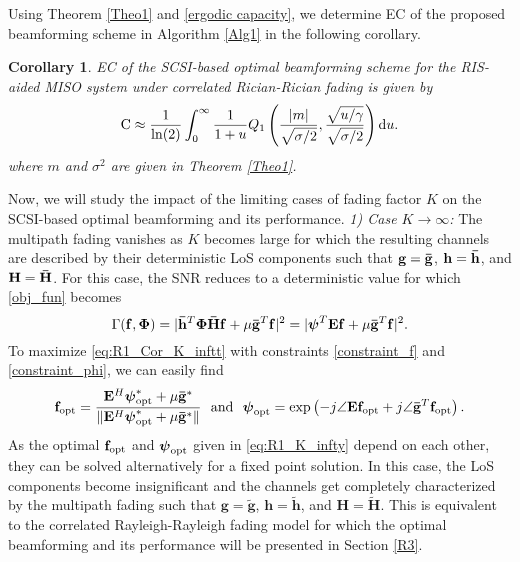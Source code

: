 \documentclass[journal,draftclsnofoot,onecolumn,12pt]{IEEEtran}
\newtheorem{corollary}{Corollary}[theorem]
\begin{document}
Using Theorem \ref{Theo1} and \eqref{ergodic capacity}, we determine EC of the proposed beamforming scheme  in Algorithm \ref{Alg1} in the following corollary.
\begin{corollary}
\label{cor:R1_EC}
EC of the SCSI-based optimal beamforming scheme for the RIS-aided MISO system under correlated Rician-Rician fading is given by
\begin{align}
    {\rm C} \approx \frac{1}{\ln(2)}\int_0^\infty \frac{1}{1+u}Q_1\left(\frac{|m|}{\sqrt{\sigma/2}},\frac{\sqrt{{u}/{\gamma}}}{\sqrt{\sigma/2}}\right){\rm d}u.
\end{align}
where $m$ and $\sigma^2$ are given in Theorem \eqref{Theo1}.
\end{corollary}

Now, we will study the impact of the limiting cases of fading factor $K$ on the SCSI-based optimal  beamforming  and its performance.   \newline
{\em 1) Case $K\to\infty$:} The multipath fading vanishes  as $K$ becomes large for which the resulting channels are described by their deterministic LoS components such that $\mathbf{g}=\mathbf{\Bar{g}}$, $\mathbf{h} = \mathbf{\Bar{h}}$, and $\mathbf{H} = \mathbf{\Bar{H}}$.  For this case, the  {\rm SNR} reduces to a deterministic value for which  \eqref{obj_fun} becomes 
\begin{equation}
\Gamma(\mathbf{f},\mathbf{\Phi}) = |\mathbf{\Bar{h}}^T\mathbf{\Phi\Bar{H}f} + \mu\mathbf{\Bar{g}}^T\mathbf{f}|^2 = |\boldsymbol{\psi}^T\mathbf{Ef} + \mu\mathbf{\Bar{g}}^T\mathbf{f}|^2.\label{eq:R1_Cor_K_inftt}
\end{equation}
 To maximize \eqref{eq:R1_Cor_K_inftt} with constraints \eqref{constraint_f} and \eqref{constraint_phi}, we can easily find
 \begin{align}
     \mathbf{f}_{\rm opt}=\frac{\mathbf{E}^H\boldsymbol{\psi}^*_{\rm opt} + \mu\mathbf{\Bar{g}}^*}{\|\mathbf{E}^H\boldsymbol{\psi}^*_{\rm opt} + \mu\mathbf{\Bar{g}}^*\|}\text{~~and~~}\boldsymbol{\psi}_{\rm opt}=\exp\left(-j\angle{\mathbf{E}\mathbf{f}_{\rm opt}} + j\angle{\mathbf{\Bar{g}}^T\mathbf{f}_{\rm opt}}\right).\label{eq:R1_K_infty}
 \end{align}
 As the optimal $\mathbf{f}_{\rm opt}$ and $\boldsymbol{\psi}_{\rm opt}$ given in \eqref{eq:R1_K_infty} depend on each other, they can be solved alternatively for a fixed point solution.
  In this case, the LoS components become insignificant and the channels get completely characterized   by the multipath fading  such that $\mathbf{g}=\mathbf{\tilde{g}}$, $\mathbf{h} = \mathbf{\tilde{h}}$, and $\mathbf{H} = \mathbf{\tilde{H}}$. This is equivalent to the correlated Rayleigh-Rayleigh fading model for which the optimal beamforming and its performance will be presented in  Section \ref{R3}.
 
\end{document}
